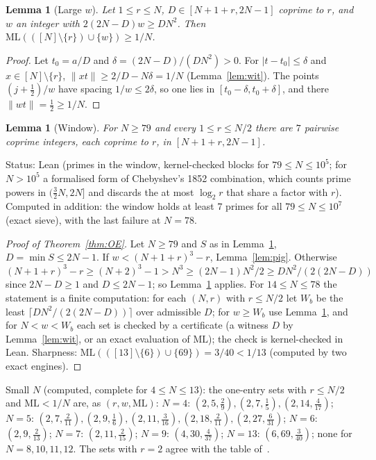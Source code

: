 \documentclass[11pt]{article}
\newtheorem{lemma}[theorem]{Lemma}
\theoremstyle{definition}
\theoremstyle{remark}
\newcommand{\nd}[1]{\lVert #1\rVert}
\newcommand{\ML}{\mathrm{ML}}
\begin{document}
\begin{lemma}[Large $w$]\label{lem:large}
Let $1\le r\le N$, $D\in[N+1+r,2N-1]$ coprime to $r$, and $w$ an integer with $2(2N-D)w\ge DN^2$. Then $\ML(([N]\setminus\{r\})\cup\{w\})\ge1/N$.
\end{lemma}
\begin{proof}
Let $t_0=a/D$ and $\delta=(2N-D)/(DN^2)>0$. For $|t-t_0|\le\delta$ and $x\in[N]\setminus\{r\}$, $\nd{xt}\ge2/D-N\delta=1/N$ (Lemma~\ref{lem:wit}). The points $(j+\frac12)/w$ have spacing $1/w\le2\delta$, so one lies in $[t_0-\delta,t_0+\delta]$, and there $\nd{wt}=\frac12\ge1/N$.
\end{proof}

\begin{lemma}[Window]\label{lem:win}
For $N\ge79$ and every $1\le r\le N/2$ there are $7$ pairwise coprime integers, each coprime to $r$, in $[N+1+r,2N-1]$.
\end{lemma}
Status: Lean (primes in the window, kernel-checked blocks for $79\le N\le10^5$; for $N>10^5$ a formalised form of Chebyshev's 1852 combination, which counts prime powers in $(\frac32N,2N]$ and discards the at most $\log_2r$ that share a factor with $r$). Computed in addition: the window holds at least $7$ primes for all $79\le N\le10^7$ (exact sieve), with the last failure at $N=78$.

\begin{proof}[Proof of Theorem~\ref{thm:OE}]
Let $N\ge79$ and $S$ as in Lemma~\ref{lem:win}, $D=\min S\le2N-1$. If $w<(N+1+r)^3-r$, Lemma~\ref{lem:pig}. Otherwise $(N+1+r)^3-r\ge(N+2)^3-1>N^3\ge(2N-1)N^2/2\ge DN^2/(2(2N-D))$ since $2N-D\ge1$ and $D\le2N-1$; so Lemma~\ref{lem:large} applies. For $14\le N\le78$ the statement is a finite computation: for each $(N,r)$ with $r\le N/2$ let $W_b$ be the least $\lceil DN^2/(2(2N-D))\rceil$ over admissible $D$; for $w\ge W_b$ use Lemma~\ref{lem:large}, and for $N<w<W_b$ each set is checked by a certificate (a witness $D$ by Lemma~\ref{lem:wit}, or an exact evaluation of $\ML$); the check is kernel-checked in Lean. Sharpness: $\ML(([13]\setminus\{6\})\cup\{69\})=3/40<1/13$ (computed by two exact engines).
\end{proof}

Small $N$ (computed, complete for $4\le N\le13$): the one-entry sets with $r\le N/2$ and $\ML<1/N$ are, as $(r,w,\ML)$: $N=4$: $(2,5,\frac29),(2,7,\frac15),(2,14,\frac4{17})$; $N=5$: $(2,7,\frac2{11}),(2,9,\frac16),(2,11,\frac3{16}),(2,18,\frac2{11}),(2,27,\frac6{31})$; $N=6$: $(2,9,\frac2{13})$; $N=7$: $(2,11,\frac2{15})$; $N=9$: $(4,30,\frac4{37})$; $N=13$: $(6,69,\frac3{40})$; none for $N=8,10,11,12$. The sets with $r=2$ agree with the table of~\cite{Z}.
\end{document}
